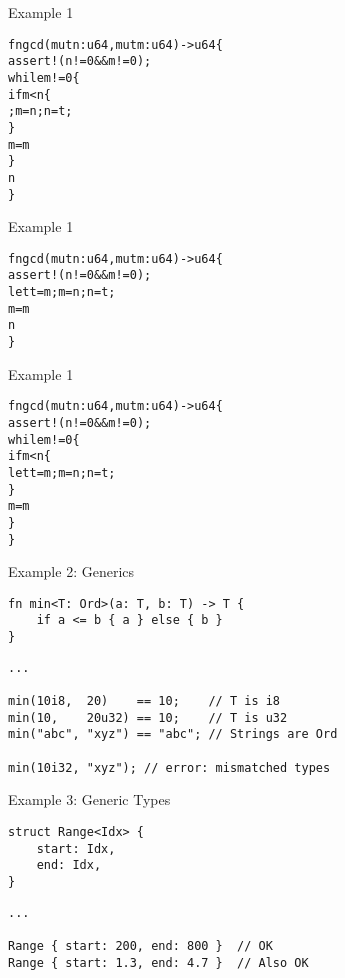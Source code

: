 
\begin{frame}[fragile]{Example 1}
\begin{alltt}
fn gcd(mut n: u64, mut m: u64) -> u64 \{
    assert!(n != 0 && m != 0);
    while m != 0 \{
        if m < n \{
            ; m = n; n = t;
        \}
        m = m % n;
    \}
    n
\}
\end{alltt}
\end{frame}


\begin{frame}[fragile]{Example 1}
\begin{alltt}
fn gcd(mut n: u64, mut m: u64) -> u64 \{
    assert!(n != 0 && m != 0);
            let t = m; m = n; n = t;
        \hi{\}}
        m = m % n;
    \hi{\}}
    n
\}
\end{alltt}
\end{frame}


\begin{frame}[fragile]{Example 1}
\begin{alltt}
fn gcd(mut n: u64, mut m: u64) -> u64 \{
    assert!(n != 0 && m != 0);
    while m != 0 \{
        if m < n \{
            let t = m; m = n; n = t;
        \}
        m = m % n;
    \}
\}
\end{alltt}
\end{frame}


\begin{frame}[fragile]{Example 2: Generics}

\begin{verbatim}
fn min<T: Ord>(a: T, b: T) -> T {
    if a <= b { a } else { b }
}
\end{verbatim}
\pause
\begin{verbatim}
...

min(10i8,  20)    == 10;    // T is i8
min(10,    20u32) == 10;    // T is u32
min("abc", "xyz") == "abc"; // Strings are Ord

min(10i32, "xyz"); // error: mismatched types
\end{verbatim}

\end{frame}


\begin{frame}[fragile]{Example 3: Generic Types}
\begin{verbatim}
struct Range<Idx> {
    start: Idx,
    end: Idx,
}
\end{verbatim}
\pause
\begin{verbatim}
...

Range { start: 200, end: 800 }  // OK
Range { start: 1.3, end: 4.7 }  // Also OK
\end{verbatim}
\end{frame}

